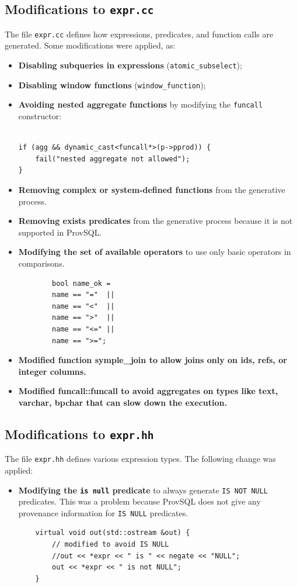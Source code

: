 \documentclass{article}
\begin{document}
\subsection{Modifications to \texttt{expr.cc}}
The file \texttt{expr.cc} defines how expressions, predicates, and function calls
are generated. Some modifications were applied, as:
\begin{itemize}
    \item \textbf{Disabling subqueries in expressions}
          (\texttt{atomic\_subselect});
    \item \textbf{Disabling window functions}
          (\texttt{window\_function});
    \item \textbf{Avoiding nested aggregate functions} by modifying the
          \texttt{funcall} constructor:
\begin{lstlisting}

if (agg && dynamic_cast<funcall*>(p->pprod)) {
    fail("nested aggregate not allowed");
}
\end{lstlisting}

    \item \textbf{Removing complex or system-defined functions} from the generative process.
    \item \textbf{Removing exists predicates} from the generative process because it is not supported in ProvSQL.
    \item \textbf{Modifying the set of available operators} to use only basic operators in comparisons.
    \begin{lstlisting}
        bool name_ok =
        name == "="  ||
        name == "<"  ||
        name == ">"  ||
        name == "<=" ||
        name == ">=";
    \end{lstlisting}
    \item \textbf{Modified function symple\_join to allow joins only on ids, refs, or integer columns.}
    \item \textbf{Modified funcall::funcall to avoid aggregates on types like text, varchar, bpchar that can slow down the execution.}

\end{itemize}
\subsection{Modifications to \texttt{expr.hh}}
The file \texttt{expr.hh} defines various expression types.
The following change was applied:
\begin{itemize}
    \item \textbf{Modifying the \texttt{is null} predicate} to always generate \texttt{IS NOT NULL} predicates.
    This was a problem because ProvSQL does not give any provenance information for \texttt{IS NULL} predicates.
\begin{lstlisting}
    virtual void out(std::ostream &out) {
        // modified to avoid IS NULL
        //out << *expr << " is " << negate << "NULL";
        out << *expr << " is not NULL";
    }
\end{lstlisting}
\end{itemize}
\end{document}
